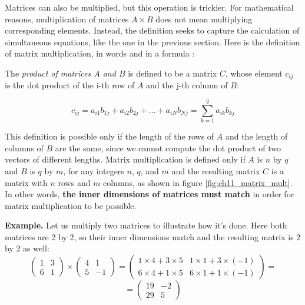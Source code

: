 \documentclass[
  letterpaper,
  DIV=11,
  numbers=noendperiod]{scrreprt}
\begin{document}
Matrices can also be multiplied, but this operation is trickier. For
mathematical reasons, multiplication of matrices \(A \times B\) does not
mean multiplying corresponding elements. Instead, the definition seeks
to capture the calculation of simultaneous equations, like the one in
the previous section. Here is the definition of matrix multiplication,
in words and in a formula \cite{strang_linear_2005}:

\begin{tcolorbox}[enhanced jigsaw, arc=.35mm, colframe=quarto-callout-note-color-frame, left=2mm, opacitybacktitle=0.6, breakable, title=\textcolor{quarto-callout-note-color}{\faInfo}\hspace{0.5em}{Definition}, toprule=.15mm, coltitle=black, bottomtitle=1mm, toptitle=1mm, colback=white, leftrule=.75mm, colbacktitle=quarto-callout-note-color!10!white, titlerule=0mm, opacityback=0, rightrule=.15mm, bottomrule=.15mm]

The \emph{product of matrices \(A\) and \(B\)} is defined to be a matrix
\(C\), whose element \(c_{ij}\) is the dot product of the i-th row of
\(A\) and the j-th column of \(B\):

\[ 
c_{ij} = a_{i1}b_{1j} + a_{i2}b_{2j} + ... + a_{iN}b_{Nj} = \sum_{k=1}^q a_{ik} b_{kj}
\]

\end{tcolorbox}

This definition is possible only if the length of the rows of \(A\) and
the length of columns of \(B\) are the same, since we cannot compute the
dot product of two vectors of different lengths. Matrix multiplication
is defined only if \(A\) is \(n\) by \(q\) and \(B\) is \(q\) by \(m\),
for any integers \(n\), \(q\), and \(m\) and the resulting matrix \(C\)
is a matrix with \(n\) rows and \(m\) columns, as shown in figure
\ref{fig:ch11_matrix_mult}. In other words, \textbf{the inner dimensions
of matrices must match} in order for matrix multiplication to be
possible.

\textbf{Example.} Let us multiply two matrices to illustrate how it's
done. Here both matrices are 2 by 2, so their inner dimensions match and
the resulting matrix is 2 by 2 as well: \[ 
\left(\begin{array}{cc}1 & 3 \\ 6 & 1\end{array}\right) \times \left(\begin{array}{cc}4 & 1 \\5 & -1 \end{array}\right) = \left(\begin{array}{cc}1 \times 4 + 3 \times 5 & 1 \times 1 +3 \times (-1) \\ 6 \times 4+ 1 \times 5 & 6 \times 1+1 \times (-1) \end{array}\right) = \]
\[= \left(\begin{array}{cc}19 & -2 \\ 29 & 5 \end{array}\right) 
\]
\end{document}
